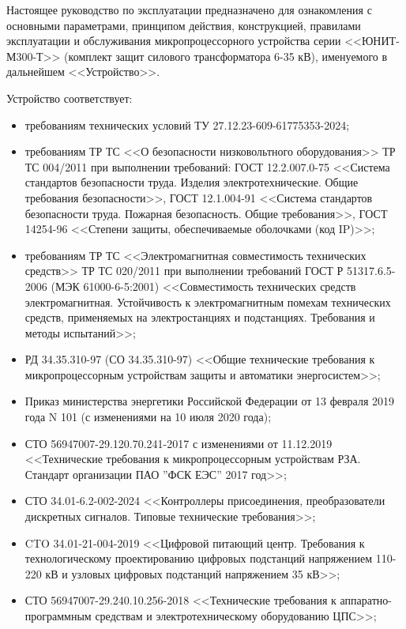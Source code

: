 \par
Настоящее руководство по эксплуатации предназначено для ознакомления с основными параметрами, принципом действия, конструкцией, правилами эксплуатации и обслуживания микропроцессорного устройства серии <<ЮНИТ-М300-Т>> (комплект защит силового трансформатора 6-35 кВ), именуемого в дальнейшем <<Устройство>>.

\par
Устройство соответствует:
\begin{itemize}
    \item требованиям технических условий ТУ 27.12.23-609-61775353-2024;
    \item требованиям ТР ТС <<О безопасности низковольтного оборудования>> ТР ТС 004/2011 при выполнении требований: ГОСТ 12.2.007.0-75 <<Система стандартов безопасности труда. Изделия электротехнические. Общие требования безопасности>>, ГОСТ 12.1.004-91 <<Система стандартов безопасности труда. Пожарная безопасность. Общие требования>>, ГОСТ 14254-96 <<Степени защиты, обеспечиваемые оболочками (код IP)>>; 
    \item требованиям ТР ТС <<Электромагнитная совместимость технических средств>> ТР ТС 020/2011 при выполнении требований ГОСТ Р 51317.6.5-2006 (МЭК 61000-6-5:2001) <<Совместимость технических средств электромагнитная. Устойчивость к электромагнитным помехам технических средств, применяемых на электростанциях и подстанциях. Требования и методы испытаний>>;
    \item РД 34.35.310-97 (СО 34.35.310-97) <<Общие технические требования к микропроцессорным устройствам защиты и автоматики энергосистем>>;
    \item Приказ министерства энергетики Российской Федерации от 13 февраля 2019 года N 101 (с изменениями на 10 июля 2020 года);
    \item СТО 56947007-29.120.70.241-2017 с изменениями от 11.12.2019 <<Технические требования к микропроцессорным устройствам РЗА. Стандарт организации ПАО ''ФСК ЕЭС'' 2017 год>>;
    \item СТО 34.01-6.2-002-2024 <<Контроллеры присоединения, преобразователи дискретных сигналов. Типовые технические требования>>;
    \item CTO 34.01-21-004-2019 <<Цифровой питающий центр. Требования к технологическому проектированию цифровых подстанций напряжением 110-220 кВ и узловых цифровых подстанций напряжением 35 кВ>>;
    \item СТО 56947007-29.240.10.256-2018 <<Технические требования к аппаратно-программным средствам и электротехническому оборудованию ЦПС>>;

\end{itemize}
